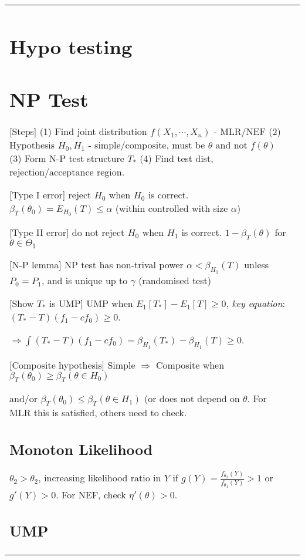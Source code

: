 
\begin{tabulary}{\textwidth}{l || L}

	\section{Hypo testing}

	\section{NP Test}

	 [Steps]
	 (1) Find joint distribution $f(X_1, \cdots, X_n)$ - MLR/NEF
	(2) Hypothesis $H_0, H_1$ - simple/composite, must be $\theta$ and not $f(\theta)$
	(3) Form N-P test structure $T_*$
	(4) Find test dist, rejection/acceptance region.

		[Type I error] reject $H_0$ when $H_0$ is correct. $\beta_T(\theta_0) =
		E_{H_0}(T) \leq \alpha$ (within controlled with size $\alpha$)

	[Type II error] do not reject $H_0$ when $H_1$ is correct.
	$1 - \beta_T(\theta)$ for $\theta\in\Theta_1$

	[N-P lemma]
	NP test has non-trival power $\alpha < \beta_{H_1}(T)$ unless $P_0=P_1$,
	and is unique up to $\gamma$ (randomised test)

	[Show $T_*$ is UMP]
	UMP when $E_1[T_*]-E_1[T]\geq 0$,
	\textit{key equation}: $(T_*-T)(f_1-cf_0)\geq 0$.

	$\Rightarrow \int (T_*-T)(f_1-cf_0) = \beta_{H_1}(T_*) - \beta_{H_1}(T) \geq 0$.

		[Composite hypothesis]
	Simple $\Rightarrow$ Composite when
	$\beta_T(\theta_0) \geq \beta_T(\theta \in H_0)$

	and/or $\beta_T(\theta_0) \leq \beta_T(\theta \in H_1)$ (or does not depend on
	$\theta$.
	For MLR this is satisfied, others need to check.


	\subsection{Monoton Likelihood}

	$\theta_2 > \theta_2$, increasing likelihood ratio in $Y$ if
	$g(Y) = \frac{f_{\theta_2}(Y)}{f_{\theta_1}(Y)} > 1$ or $g'(Y) > 0$.
	For NEF, check $\eta'(\theta) > 0$.


	\subsection{UMP}


\end{tabulary}
